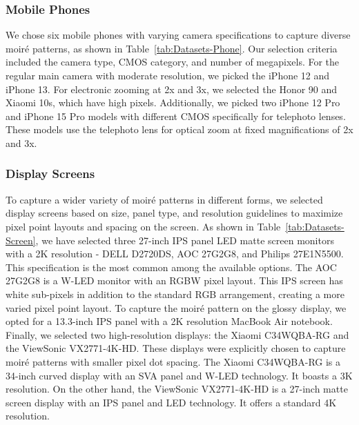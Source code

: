 \subsubsection{Mobile Phones} 
We chose six mobile phones with varying camera specifications to capture diverse moiré patterns, as shown in Table~\ref{tab:Datasets-Phone}. Our selection criteria included the camera type, CMOS category, and number of megapixels. For the regular main camera with moderate resolution, we picked the iPhone 12 and iPhone 13. For electronic zooming at 2x and 3x, we selected the Honor 90 and Xiaomi 10s, which have high pixels. Additionally, we picked two iPhone 12 Pro and iPhone 15 Pro models with different CMOS specifically for telephoto lenses. These models use the telephoto lens for optical zoom at fixed magnifications of 2x and 3x.

\subsubsection{Display Screens} 
To capture a wider variety of moiré patterns in different forms, we selected display screens based on size, panel type, and resolution guidelines to maximize pixel point layouts and spacing on the screen. As shown in Table~\ref{tab:Datasets-Screen}, we have selected three 27-inch IPS panel LED matte screen monitors with a 2K resolution - DELL D2720DS, AOC 27G2G8, and Philips 27E1N5500. This specification is the most common among the available options. The AOC 27G2G8 is a W-LED monitor with an RGBW pixel layout. This IPS screen has white sub-pixels in addition to the standard RGB arrangement, creating a more varied pixel point layout. To capture the moiré pattern on the glossy display, we opted for a 13.3-inch IPS panel with a 2K resolution MacBook Air notebook. Finally, we selected two high-resolution displays: the Xiaomi C34WQBA-RG and the ViewSonic VX2771-4K-HD. These displays were explicitly chosen to capture moiré patterns with smaller pixel dot spacing. The Xiaomi C34WQBA-RG is a 34-inch curved display with an SVA panel and W-LED technology. It boasts a 3K resolution. On the other hand, the ViewSonic VX2771-4K-HD is a 27-inch matte screen display with an IPS panel and LED technology. It offers a standard 4K resolution.

